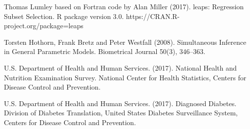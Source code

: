 \documentclass[letter,12pt]{article}
\begin{document}
	\begin{hangparas}{.5in}{1}
	  Thomas Lumley based on Fortran code by Alan Miller (2017). leaps: Regression Subset Selection. R package version 3.0. https://CRAN.R-project.org/package=leaps
	\end{hangparas}
	\begin{hangparas}{.5in}{1}
		Torsten Hothorn, Frank Bretz and Peter Westfall (2008). Simultaneous Inference in General Parametric Models. Biometrical Journal 50(3), 346--363.
	\end{hangparas}
	\begin{hangparas}{.5in}{1}
	  U.S. Department of Health and Human Services. (2017). National Health and Nutrition Examination Survey. National Center for Health Statistics, Centers for Disease Control and Prevention.
	\end{hangparas}
	\begin{hangparas}{.5in}{1}
	  U.S. Department of Health and Human Services. (2017). Diagnosed Diabetes. Division of Diabetes Translation, United States Diabetes Surveillance System, Centers for Disease Control and Prevention.
	\end{hangparas}
\end{document}
